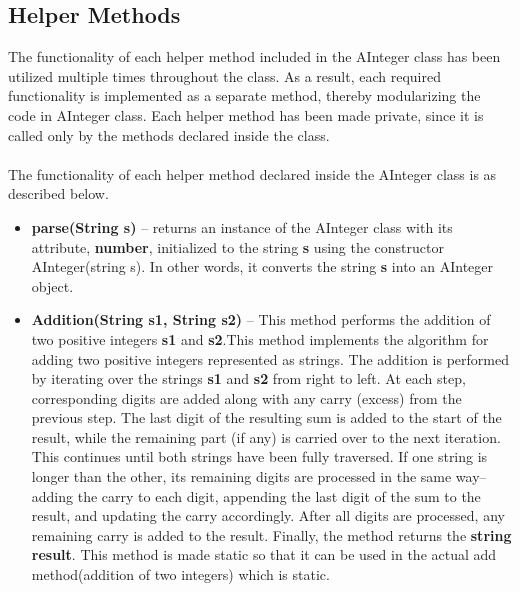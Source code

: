 \documentclass[a4paper,12pt]{article}
\begin{document}
{\subsection{Helper Methods}
The functionality of each helper method included in the AInteger class has been utilized multiple times throughout the class. As a result, each required functionality is implemented as a separate method, thereby modularizing the code in AInteger class. Each helper method has been made private, since it is called only by the methods declared inside the class.\\\\
The functionality of each helper method declared inside the AInteger class is as described below.
\begin{itemize}
    \item \textbf{parse(String s)} -- returns an instance of the AInteger class with its attribute, \textbf{number}, initialized to the string \textbf{s} using the constructor AInteger(string s). In other words, it converts the string \textbf{s} into an AInteger object.\\

    \item \textbf{Addition(String s1, String s2)} -- This method performs the addition of two positive integers \textbf{s1} and \textbf{s2}.This method implements the algorithm for adding two positive integers represented as strings. The addition is performed by iterating over the strings \textbf{s1} and \textbf{s2} from right to left. At each step, corresponding digits are added along with any carry (excess) from the previous step. The last digit of the resulting sum is added to the start of the result, while the remaining part (if any) is carried over to the next iteration. This continues until both strings have been fully traversed. If one string is longer than the other, its remaining digits are processed in the same way--adding the carry to each digit, appending the last digit of the sum to the result, and updating the carry accordingly. After all digits are processed, any remaining carry is added to the result. Finally, the method returns the \textbf{string result}. This method is made static so that it can be used in the actual add method(addition of two integers) which is static.\\


\end{itemize}}
\end{document}
